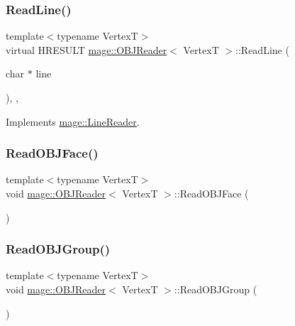 \subsubsection{\texorpdfstring{Read\+Line()}{ReadLine()}}
{\footnotesize\ttfamily template$<$typename VertexT$>$ \\
virtual H\+R\+E\+S\+U\+LT \hyperlink{classmage_1_1_o_b_j_reader}{mage\+::\+O\+B\+J\+Reader}$<$ VertexT $>$\+::Read\+Line (\begin{DoxyParamCaption}\item[{char $\ast$}]{line }\end{DoxyParamCaption})\hspace{0.3cm}{\ttfamily [override]}, {\ttfamily [private]}, {\ttfamily [virtual]}}



Implements \hyperlink{classmage_1_1_line_reader_a193ad5c9084eb87e8a98a3c1782d93ff}{mage\+::\+Line\+Reader}.

\hypertarget{classmage_1_1_o_b_j_reader_a647cd7683007f351096702924ce46a3b}{}\label{classmage_1_1_o_b_j_reader_a647cd7683007f351096702924ce46a3b} 
\subsubsection{\texorpdfstring{Read\+O\+B\+J\+Face()}{ReadOBJFace()}}
{\footnotesize\ttfamily template$<$typename VertexT$>$ \\
void \hyperlink{classmage_1_1_o_b_j_reader}{mage\+::\+O\+B\+J\+Reader}$<$ VertexT $>$\+::Read\+O\+B\+J\+Face (\begin{DoxyParamCaption}{ }\end{DoxyParamCaption})\hspace{0.3cm}{\ttfamily [private]}}

\hypertarget{classmage_1_1_o_b_j_reader_a8159620b12d426073581202fee022662}{}\label{classmage_1_1_o_b_j_reader_a8159620b12d426073581202fee022662} 
\subsubsection{\texorpdfstring{Read\+O\+B\+J\+Group()}{ReadOBJGroup()}}
{\footnotesize\ttfamily template$<$typename VertexT$>$ \\
void \hyperlink{classmage_1_1_o_b_j_reader}{mage\+::\+O\+B\+J\+Reader}$<$ VertexT $>$\+::Read\+O\+B\+J\+Group (\begin{DoxyParamCaption}{ }\end{DoxyParamCaption})\hspace{0.3cm}{\ttfamily [private]}}

